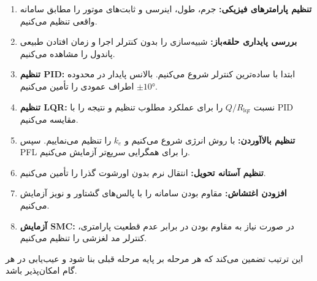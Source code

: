 \begin{enumerate}[label=\arabic*.]
    \item \textbf{تنظیم پارامترهای فیزیکی:} جرم، طول، اینرسی و ثابت‌های موتور را مطابق سامانه واقعی تنظیم می‌کنیم.
    \item \textbf{بررسی پایداری حلقه‌باز:} شبیه‌سازی را بدون کنترلر اجرا و زمان افتادن طبیعی پاندول را مشاهده می‌کنیم.
    \item \textbf{تنظیم PID:} ابتدا با ساده‌ترین کنترلر شروع می‌کنیم. بالانس پایدار در محدوده $\pm 10°$ اطراف عمودی را تأمین می‌کنیم.
    \item \textbf{تنظیم LQR:} نسبت $Q/R_{\text{lqr}}$ را برای عملکرد مطلوب تنظیم و نتیجه را با PID مقایسه می‌کنیم.
    \item \textbf{تنظیم بالاآوردن:} با روش انرژی شروع می‌کنیم و $k_e$ را تنظیم می‌نماییم. سپس PFL را برای همگرایی سریع‌تر آزمایش می‌کنیم.
    \item \textbf{تنظیم آستانه تحویل:} انتقال نرم بدون اورشوت گذرا را تأمین می‌کنیم.
    \item \textbf{افزودن اغتشاش:} مقاوم بودن سامانه را با پالس‌های گشتاور و نویز آزمایش می‌کنیم.
    \item \textbf{آزمایش SMC:} در صورت نیاز به مقاوم بودن در برابر عدم قطعیت پارامتری، کنترلر مد لغزشی را تنظیم می‌کنیم.
\end{enumerate}

این ترتیب تضمین می‌کند که هر مرحله بر پایه مرحله قبلی بنا شود و عیب‌یابی در هر گام امکان‌پذیر باشد.
